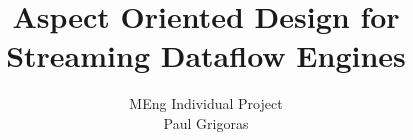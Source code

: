 \documentclass{beamer}
\title{\Large Aspect Oriented Design for Streaming Dataflow Engines}
\author{\large MEng Individual Project \hfill \\[0.5cm] {\small Paul Grigoras}} %
\date{}
\begin{document}
    \begin{frame}
      \titlepage
    \end{frame}

    \begin{frame}
      \tableofcontents
    \end{frame}

    
    
    
    
    
    


   
\end{document}
